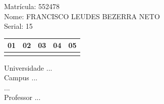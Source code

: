 \documentclass[10pt,a4paper,twocolumn]{report}
\begin{document}
Matrícula: 552478\\ Nome: FRANCISCO LEUDES BEZERRA NETO \\ Serial: 15\\
\begin{tabular}{|l|l|l|l|l|}\hline
01  &02  &03  &04  &05 \\ \hline 
 & & & & \\ \hline 
\end{tabular}
 \cleardoublepage 

\begin{flushleft}
Universidade ...\\
Campus ...\\
...\\
Professor ...\\
\end{flushleft}
\end{document}
